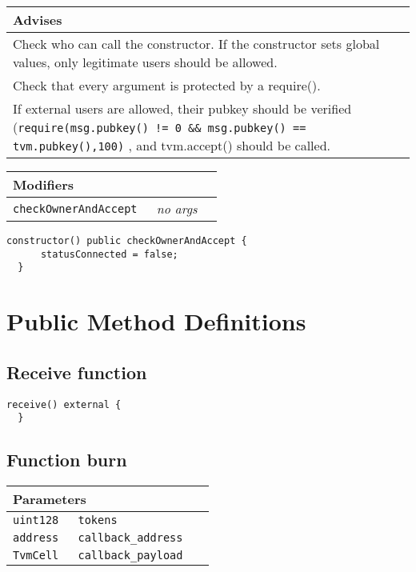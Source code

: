 \ifsoldraft
\noindent\begin{tabular}{|p{12cm}|}\hline
\rowcolor{green}Advises
\\\hline
Check who can call the constructor. If the constructor sets global values, only legitimate users should be allowed.
\\\hline
Check that every argument is protected by a require().
\\\hline
If external users are allowed, their pubkey should be verified (\verb+require(msg.pubkey() != 0 && msg.pubkey() == tvm.pubkey(),100)+ , and tvm.accept() should be called.
\\\hline\end{tabular}
\fi

\ifsoltables
\noindent\begin{tabular}{|l|l|p{5cm}|}\hline
\multicolumn{3}{|l|}{\bf Modifiers}\\\hline
\tt checkOwnerAndAccept & {\em no args} &\\\hline
\end{tabular}
\fi

\vspace{2cm}

\begin{lstlisting}[firstnumber=39]
  constructor() public checkOwnerAndAccept {
      statusConnected = false;
  }
\end{lstlisting}

\section{Public Method Definitions}


\subsection{Receive function}

\vspace{2cm}

\begin{lstlisting}[firstnumber=129]
  receive() external {
  }
\end{lstlisting}

\subsection{Function burn}


\ifsoltables
\noindent\begin{tabular}{|l|l|p{5cm}|}\hline
\multicolumn{3}{|l|}{\bf Parameters}\\\hline
\tt uint128 & \tt tokens &\\\hline
\tt address & \tt callback\_{}address &\\\hline
\tt TvmCell & \tt callback\_{}payload &\\\hline
\end{tabular}
\fi

